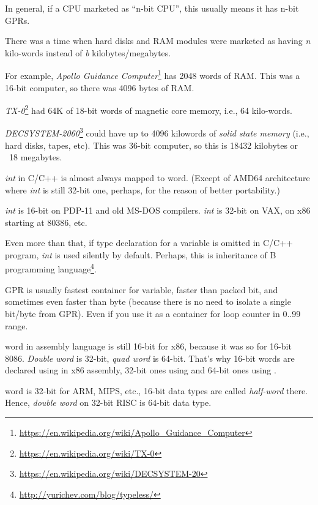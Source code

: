 In general, if a CPU marketed as ``n-bit CPU'', this usually means it has n-bit \ac{GPR}s.

There was a time when hard disks and \ac{RAM} modules were marketed as having \emph{n} kilo-words instead of
\emph{b} kilobytes/megabytes.

For example, \emph{Apollo Guidance Computer}\footnote{\url{https://en.wikipedia.org/wiki/Apollo_Guidance_Computer}}
has 2048 words of \ac{RAM}.
This was a 16-bit computer, so there was 4096 bytes of \ac{RAM}.

\emph{TX-0}\footnote{\url{https://en.wikipedia.org/wiki/TX-0}} had 64K of 18-bit words of magnetic core memory,
i.e., 64 kilo-words.

\emph{DECSYSTEM-2060}\footnote{\url{https://en.wikipedia.org/wiki/DECSYSTEM-20}}
could have up to 4096 kilowords of \emph{solid state memory}
(i.e., hard disks, tapes, etc).
This was 36-bit computer, so this is 18432 kilobytes or ~18 megabytes.

\myhrule{}

\emph{int} in C/C++ is almost always mapped to \gls{word}.
(Except of AMD64 architecture where \emph{int} is still 32-bit one, perhaps, for the reason of better portability.)

\emph{int} is 16-bit on PDP-11 and old MS-DOS compilers.
\emph{int} is 32-bit on VAX, on x86 starting at 80386, etc.

Even more than that, if type declaration for a variable is omitted in C/C++ program, \emph{int} is used silently by default.
Perhaps, this is inheritance of B programming language\footnote{\url{http://yurichev.com/blog/typeless/}}.

\myhrule{}

\ac{GPR} is usually fastest container for variable, faster than packed bit,
and sometimes even faster than byte (because there is no need to isolate a single bit/byte from \ac{GPR}).
Even if you use it as a container for loop counter in 0..99 range.

\myhrule{}

\Gls{word} in assembly language is still 16-bit for x86, because it was so for 16-bit 8086.
\emph{Double word} is 32-bit, \emph{quad word} is 64-bit.
That's why 16-bit words are declared using  in x86 assembly, 32-bit ones using  and 64-bit ones using .

\Gls{word} is 32-bit for ARM, MIPS, etc., 16-bit data types are called \emph{half-word} there.
Hence, \emph{double word} on 32-bit RISC is 64-bit data type.

